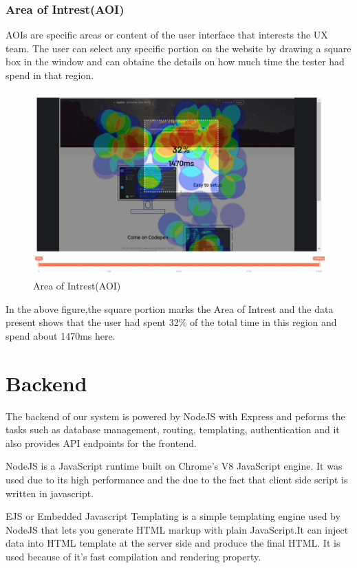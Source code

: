 \documentclass[12pt,a4paper,final]{extreport}
\begin{document}
\subsubsection{Area of Intrest(AOI)}
AOIs are specific areas or content of the user interface that
interests the UX team. The user can select any specific portion on the website by drawing a square box in the window and can obtaine the details on how much time the tester had spend in that region.
\begin{figure}[H]
    \centering
    \includegraphics[width=\linewidth]{AOI.png}
    \caption{Area of Intrest(AOI)}
\end{figure}
In the above figure,the square portion marks the Area of Intrest and the data present shows that the user had spent 32\% of the total time in this region and spend about 1470ms here.

\section{Backend}
The backend of our system is powered by NodeJS with Express and peforms the tasks such as database management, routing, templating, authentication and it also provides API endpoints for the frontend. 

NodeJS is a JavaScript runtime built on Chrome's V8 JavaScript engine. It was used due to its high performance and the due to the fact that client side script is written in javascript.

EJS or Embedded Javascript Templating is a simple templating engine used by NodeJS that lets you generate HTML markup with plain JavaScript.It can inject data into HTML template at the server side and produce the final HTML. It is used because of it's fast compilation and rendering property.
\end{document}
